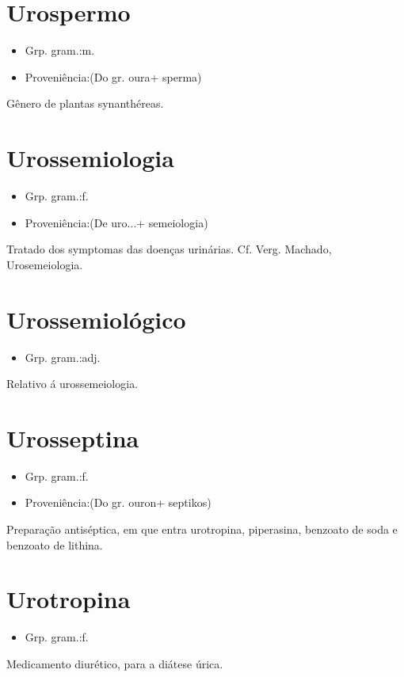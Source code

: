 \documentclass{article}
\begin{document}
\section{Urospermo}
\begin{itemize}
\item {Grp. gram.:m.}
\end{itemize}
\begin{itemize}
\item {Proveniência:(Do gr. \textunderscore oura\textunderscore  + \textunderscore sperma\textunderscore )}
\end{itemize}
Gênero de plantas synanthéreas.
\section{Urossemiologia}
\begin{itemize}
\item {Grp. gram.:f.}
\end{itemize}
\begin{itemize}
\item {Proveniência:(De \textunderscore uro...\textunderscore  + \textunderscore semeiologia\textunderscore )}
\end{itemize}
Tratado dos symptomas das doenças urinárias. Cf. Verg. Machado, \textunderscore Urosemeiologia\textunderscore .
\section{Urossemiológico}
\begin{itemize}
\item {Grp. gram.:adj.}
\end{itemize}
Relativo á urossemeiologia.
\section{Urosseptina}
\begin{itemize}
\item {Grp. gram.:f.}
\end{itemize}
\begin{itemize}
\item {Proveniência:(Do gr. \textunderscore ouron\textunderscore  + \textunderscore septikos\textunderscore )}
\end{itemize}
Preparação antiséptica, em que entra urotropina, piperasina, benzoato de soda e benzoato de lithina.
\section{Urotropina}
\begin{itemize}
\item {Grp. gram.:f.}
\end{itemize}
Medicamento diurético, para a diátese úrica.
\end{document}

